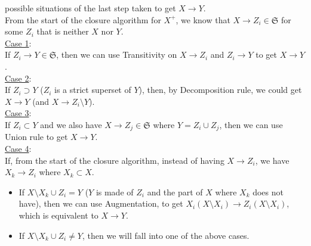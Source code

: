 \documentclass[12pt]{article}
\begin{document}
\begin{enumerate}
\begin{itemize}
\begin{itemize}
                possible situations of the last step taken to get $X
                \longrightarrow Y$. \\
                From the start of the closure algorithm for $X^+$, we know that
                $X \longrightarrow Z_i \in \mathfrak{S}$ for some $Z_i$ that is
                neither $X$ nor $Y$. \\
                \underline{Case 1}: \\
                If $Z_i \longrightarrow Y \in \mathfrak{S}$, then we can use
                Transitivity on $X \longrightarrow Z_i$ and $Z_i \longrightarrow
                Y$ to get $X \longrightarrow Y$. \\
                \underline{Case 2}: \\
                If $Z_i \supset Y$ ($Z_i$ is a strict superset of $Y$), then, by
                Decomposition rule, we could get $X \longrightarrow Y$ (and $X
                \longrightarrow Z_i \setminus Y$). \\
                \underline{Case 3}: \\
                If $Z_i \subset Y$ and we also have $X \longrightarrow Z_j \in
                \mathfrak{S}$ where $Y = Z_i \cup Z_j$, then we can use Union
                rule to get $X \longrightarrow Y$. \\
                \underline{Case 4}: \\
                If, from the start of the closure algorithm, instead of having
                $X \longrightarrow Z_i$, we have $X_k \longrightarrow Z_i$ where
                $X_k \subset X$.
                \begin{itemize}
                  \item If $X \setminus X_k \cup Z_i = Y$ ($Y$ is made of $Z_i$
                        and the part of $X$ where $X_k$ does not have), then we
                        can use Augmentation, to get $X_i (X \setminus X_i)
                        \longrightarrow Z_i (X \setminus X_i)$, which is
                        equivalent to $X \longrightarrow Y$.
                  \item If $X \setminus X_k \cup Z_i \neq Y$, then we will fall
                        into one of the above cases.
                \end{itemize}
                
        \end{itemize}
    \end{itemize}
  \ \\


\end{enumerate}
\end{document}
